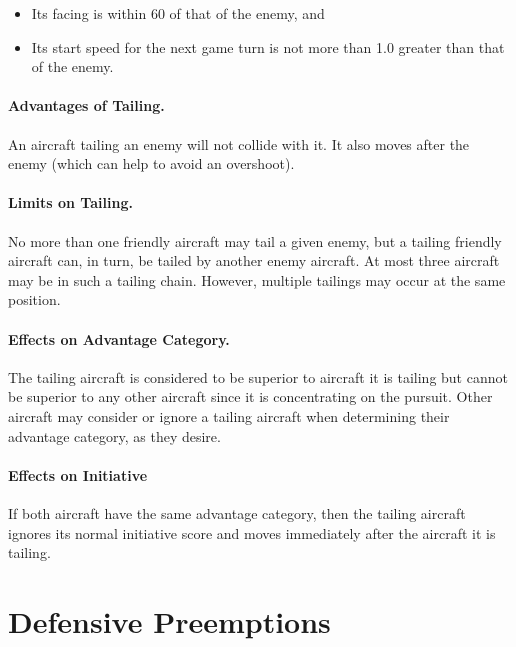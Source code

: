 {\begin{itemize}

    \item Its facing is within 60{\deg} of that of the enemy, and
    
    \item Its start speed for the next game turn is not more than 1.0 greater than that of the enemy.

\end{itemize}

\paragraph{Advantages of Tailing.} An aircraft tailing an enemy will not collide with it. It also moves after the enemy (which can help to avoid an overshoot).

\paragraph{Limits on Tailing.} No more than one friendly aircraft may tail a given enemy, but a tailing friendly aircraft can, in turn, be tailed by another enemy aircraft. At most three aircraft may be in such a tailing chain. However, multiple tailings may occur at the same position.

\paragraph{Effects on Advantage Category.} The tailing aircraft is considered to be superior to aircraft it is tailing but cannot be superior to any other aircraft since it is concentrating on the pursuit. Other aircraft may consider or ignore a tailing aircraft when determining their advantage category, as they desire.

\paragraph{Effects on Initiative} If both aircraft have the same advantage category, then the tailing aircraft ignores its normal initiative score and moves immediately after the aircraft it is tailing.
}

\section{Defensive Preemptions}
\label{rule:defensive-preemptions}

